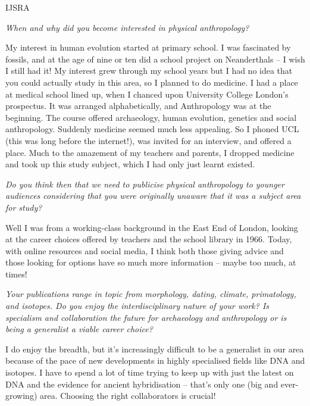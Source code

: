 \begin{labeling}{IJSRA}	
\item[IJSRA (International Journal of Student Research in Archaeology)] 
\emph{When and why did you become interested in physical anthropology?}
	
\item[Prof. Chris Stringer (CS)] 
My interest in human evolution started at primary school.
I was fascinated by fossils, and at the age of nine or ten did a school project on Neanderthals – I wish I still had it!
My interest grew through my school years but I had no idea that you could actually study in this area, so I planned to do medicine.
I had a place at medical school lined up, when I chanced upon University College London’s prospectus.
It was arranged alphabetically, and Anthropology was at the beginning.
The course offered archaeology, human evolution, genetics and social anthropology.
Suddenly medicine seemed much less appealing.
So I phoned UCL (this was long before the internet!), was invited for an interview, and offered a place.
Much to the amazement of my teachers and parents, I dropped medicine and took up this study subject,
which I had only just learnt existed.

\item[IJSRA] 
\emph{Do you think then that we need to publicise physical anthropology to younger audiences considering that you were
originally unaware that it was a subject area for study?}
	
\item[CS] 
Well I was from a working-class background in the East End of London, looking at the career choices offered by
teachers and the school library in 1966. Today, with online resources and social media,
I think both those giving advice and those looking for options have so much more information – maybe too much, at times!

\item[IJSRA]
\emph{Your publications range in topic from morphology, dating, climate, primatology, and isotopes.
Do you enjoy the interdisciplinary nature of your work? 
Is specialism and collaboration the future for archaeology and anthropology or is being a generalist a viable career choice?}

\item[CS]
I do enjoy the breadth, but it’s increasingly difficult to be a generalist in our area because of
the pace of new developments in highly specialised fields like DNA and isotopes.
I have to spend a lot of time trying to keep up with just the latest on DNA and the evidence for ancient hybridisation – that’s only one (big and ever-growing) area. Choosing the right collaborators is crucial!


\end{labeling}
